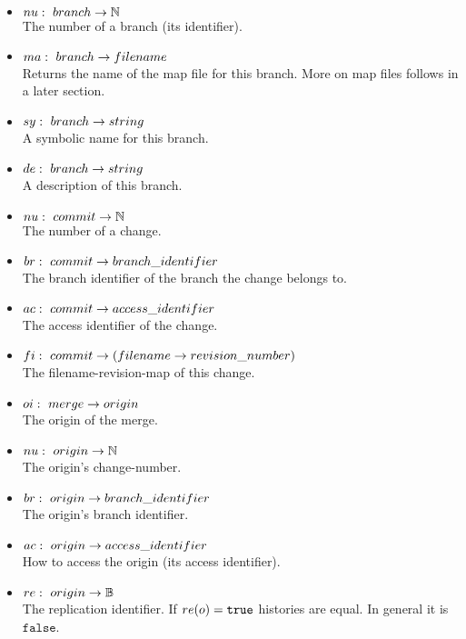 \documentclass[fleqn, 10pt, a4paper]{article}
\begin{document}
\begin{itemize}
\item $\mathnormal{nu}:\ \mathnormal{branch} \rightarrow \mathbb{N}$ \\
The number of a branch (its identifier).
\item $\mathnormal{ma}:\ \mathnormal{branch} \rightarrow \mathnormal{filename}$ \\
Returns the name of the map file for this branch. More on map files follows in
a later section.
\item $\mathnormal{sy}:\ \mathnormal{branch} \rightarrow \mathnormal{string}$ \\
A symbolic name for this branch.
\item $\mathnormal{de}:\ \mathnormal{branch} \rightarrow \mathnormal{string}$ \\
A description of this branch.
\item $\mathnormal{nu}:\ \mathnormal{commit} \rightarrow \mathbb{N}$ \\
The number of a change.
\item $\mathnormal{br}:\ \mathnormal{commit} \rightarrow \mathnormal{branch\_identifier}$ \\
The branch identifier of the branch the change belongs to.
\item $\mathnormal{ac}:\ \mathnormal{commit} \rightarrow \mathnormal{access\_identifier}$ \\
The access identifier of the change.
\item $\mathnormal{fi}:\ \mathnormal{commit} \rightarrow (\mathnormal{filename}
\rightarrow \mathnormal{revision\_number})$ \\
The filename-revision-map of this change.
\item $\mathnormal{oi}:\ \mathnormal{merge} \rightarrow \mathnormal{origin}$ \\
The origin of the merge.
\item $\mathnormal{nu}:\ \mathnormal{origin} \rightarrow \mathbb{N}$ \\
The origin's change-number.
\item $\mathnormal{br}:\ \mathnormal{origin} \rightarrow \mathnormal{branch\_identifier}$ \\
The origin's branch identifier.
\item $\mathnormal{ac}:\ \mathnormal{origin} \rightarrow \mathnormal{access\_identifier}$ \\
How to access the origin (its access identifier).
\item $\mathnormal{re}:\ \mathnormal{origin} \rightarrow \mathbb{B}$ \\
The replication identifier. If $\mathnormal{re}(o) = \mathtt{true}$
histories are equal. In general it is $\mathtt{false}$.
\end{itemize}
\end{document}

